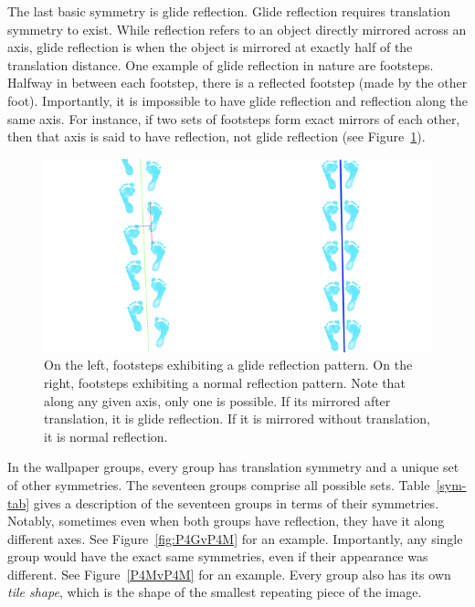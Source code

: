 The last basic symmetry is glide reflection. Glide reflection requires translation symmetry to exist. While reflection refers to an object directly mirrored across an axis, glide reflection is when the object is mirrored at exactly half of the translation distance. One example of glide reflection in nature are footsteps. Halfway in between each footstep, there is a reflected footstep (made by the other foot). Importantly, it is impossible to have glide reflection and reflection along the same axis. For instance, if two sets of footsteps form exact mirrors of each other, then that axis is said to have reflection, not glide reflection (see Figure~\ref{glide}).

\begin{figure}
\centering
\includegraphics[width=0.9\columnwidth]{glide}
\caption{On the left, footsteps exhibiting a glide reflection pattern. On the right, footsteps exhibiting a normal reflection pattern. Note that along any given axis, only one is possible. If its mirrored after translation, it is glide reflection. If it is mirrored without translation, it is normal reflection.}
\label{glide}
\end{figure}

In the wallpaper groups, every group has translation symmetry and a unique set of other symmetries. The seventeen groups comprise all possible sets. Table~\ref{sym-tab} gives a description of the seventeen groups in terms of their symmetries. Notably, sometimes even when both groups have reflection, they have it along different axes. See Figure~\ref{fig:P4GvP4M} for an example. Importantly, any single group would have the exact same symmetries, even if their appearance was different. See Figure~\ref{P4MvP4M} for an example. Every group also has its own \textit{tile shape}, which is the shape of the smallest repeating piece of the image.

